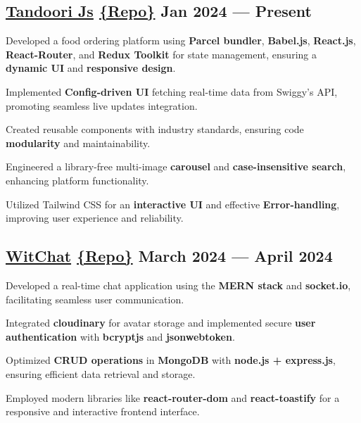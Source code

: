 \subsection{\href{https://tandoori-js.vercel.app}{Tandoori Js} \href{https://github.com/thekiranmahajan/tandoori-js}{\{Repo\}} \hfill Jan 2024 --- Present}
\begin{zitemize}
\item Developed a food ordering platform using \textbf{Parcel bundler}, \textbf{Babel.js}, \textbf{React.js}, \textbf{React-Router}, and \textbf{Redux Toolkit} for state management, ensuring a \textbf{dynamic UI} and \textbf{responsive design}.
\item Implemented \textbf{Config-driven UI} fetching real-time data from Swiggy's API, promoting seamless live updates integration.
\item Created reusable components with industry standards, ensuring code \textbf{modularity} and maintainability.
\item Engineered a library-free multi-image \textbf{carousel} and \textbf{case-insensitive search}, enhancing platform functionality.
\item Utilized Tailwind CSS for an \textbf{interactive UI} and effective \textbf{Error-handling}, improving user experience and reliability.
\end{zitemize}

\subsection{\href{http://wit-chat.onrender.com/}{WitChat} \href{https://github.com/thekiranmahajan/wit-chat}{\{Repo\}} \hfill March 2024 --- April 2024}
\begin{zitemize}
\item Developed a real-time chat application using the \textbf{MERN stack} and \textbf{socket.io}, facilitating seamless user communication.
\item Integrated \textbf{cloudinary} for avatar storage and implemented secure \textbf{user authentication} with \textbf{bcryptjs} and \textbf{jsonwebtoken}.
\item Optimized \textbf{CRUD operations} in \textbf{MongoDB} with \textbf{node.js + express.js}, ensuring efficient data retrieval and storage.
\item Employed modern libraries like \textbf{react-router-dom} and \textbf{react-toastify} for a responsive and interactive frontend interface.
\end{zitemize}

